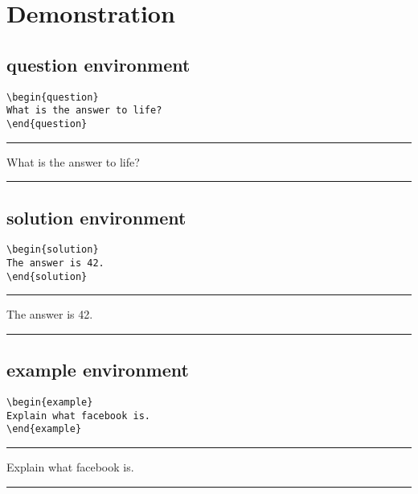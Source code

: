 \documentclass[twocolumn,twoside,11pt]{report}
\begin{document}
\section{Demonstration}

\subsection{question environment}

\begin{verbatim}
\begin{question}
What is the answer to life?
\end{question}
\end{verbatim}

\hrule
\begin{question}
What is the answer to life?
\end{question}

\vspace{3mm}
\hrule

\subsection{solution environment}

\begin{verbatim}
\begin{solution}
The answer is 42.
\end{solution}
\end{verbatim}

\hrule
\begin{solution}
The answer is 42.
\end{solution}

\vspace{3mm}
\hrule

\subsection{example environment}

\begin{verbatim}
\begin{example}
Explain what facebook is.
\end{example}
\end{verbatim}

\hrule
\begin{example}
Explain what facebook is.
\end{example}

\vspace{3mm}
\hrule
\end{document}
